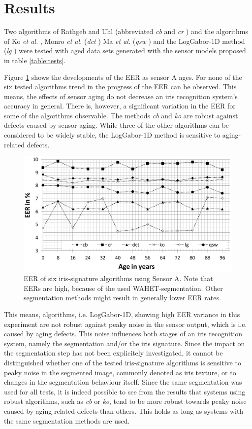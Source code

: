 \documentclass[10pt,twocolumn,letterpaper]{article}
\providecommand{\etal}[0]{\textit{et al.} }
\begin{document}
 \section{Results}
 \label{results}
 Two algorithms of Rathgeb and Uhl (abbreviated \emph{cb} and \emph{cr} \cite{rathgeb}) and the algorithms of Ko \etal \cite{ko}, Monro \etal (\emph{dct} \cite{Monro}) Ma \etal(\emph{qsw} \cite{Ma}) and the LogGabor-1D method (\emph{lg} \cite{lg}) were tested with aged data sets generated with the sensor models proposed in table \ref{table:tests}.
 
 Figure \ref{fig:sensor1} shows the developments of the EER as sensor A ages. For none of the six tested algorithms trend in the progress of the EER can be observed. This means, the effects of sensor aging do not decrease an iris recognition system's accuracy in general. There is, however, a significant variation in the EER for some of the algorithms observable. The methods \emph{cb} and \emph{ko} are robust against defects caused by sensor aging. While three of the other algorithms can be considered to be widely stable, the LogGabor-1D method is sensitive to aging-related defects. 
 
  \begin{figure}[h]
  \centering
  \includegraphics[width=\linewidth]{img/sensor1.png}
  \caption{EER of six iris-signature algorithms using Sensor A. Note that EERs are high, because of the used WAHET-segmentation. Other segmentation methods might result in generally lower EER rates.}
  \label{fig:sensor1}
\end{figure}

This means, algorithms, i.e. LogGabor-1D, showing high EER variance in this experiment are not robust against peaky noise in the sensor output, which is i.e. caused by aging defects. This noise influences both stages of an iris recognition system, namely the segmentation and/or the iris signature. Since the impact on the segmentation step has not been explicitely investigated, it cannot be distinguished whether one of the tested iris-signature algorithms is sensitive to peaky noise in the segmented image, commonly denoted as iris texture, or to changes in the segmentation behaviour itself. Since the same segmentation was used for all tests, it is indeed possible to see from the results that systems using robust algorithms, such as \emph{cb} or \emph{ko}, tend to be more robust towards peaky noise caused by aging-related defects than others. This holds as long as systems with the same segmentation methods are used.
 
\end{document}
